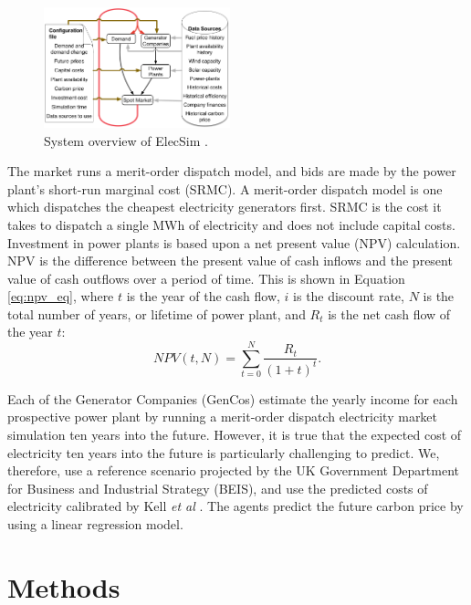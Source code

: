 \begin{figure}
    \includegraphics[width=0.48\textwidth]{Chapter5/figures/market-forecasting/methods/System_overview_large.png}
    \caption{System overview of ElecSim \cite{Kell}.}
    \label{fig:model_details}
\end{figure}


The market runs a merit-order dispatch model, and bids are made by the power plant's short-run marginal cost (SRMC). A merit-order dispatch model is one which dispatches the cheapest electricity generators first. SRMC is the cost it takes to dispatch a single MWh of electricity and does not include capital costs. Investment in power plants is based upon a net present value (NPV) calculation. NPV is the difference between the present value of cash inflows and the present value of cash outflows over a period of time. This is shown in Equation \ref{eq:npv_eq}, where $t$ is the year of the cash flow, $i$ is the discount rate, $N$ is the total number of years, or lifetime of power plant, and $R_t$ is the net cash flow of the year $t$:
\begin{equation} \label{eq:npv_eq}
NPV(t, N) = \sum_{t=0}^{N}\frac{R_t}{(1+t)^t}.
\end{equation}

Each of the Generator Companies (GenCos) estimate the yearly income for each prospective power plant by running a merit-order dispatch electricity market simulation ten years into the future. However, it is true that the expected cost of electricity ten years into the future is particularly challenging to predict. We, therefore, use a reference scenario projected by the UK Government Department for Business and Industrial Strategy (BEIS), and use the predicted costs of electricity calibrated by Kell \textit{et al} \cite{Kell2020, DBEIS2019}. The agents predict the future carbon price by using a linear regression model.


 
\section{Methods}
\label{sec:methods}

